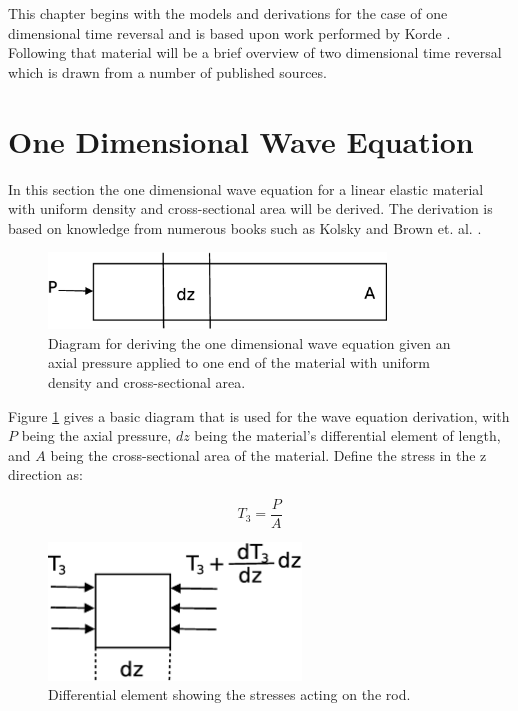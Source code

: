 This chapter begins with the models and derivations for the case of one dimensional time reversal and is based upon work performed by Korde \cite{Fehrman2012}. Following that material will be a brief overview of two dimensional time reversal which is drawn from a number of published sources.

\section{One Dimensional Wave Equation}
\label{sec:oneDWaveEquation}

In this section the one dimensional wave equation for a linear elastic material with uniform density and cross-sectional area will be derived. The derivation is based on knowledge from numerous books such as Kolsky \cite{Kolsky1963} and Brown et. al. \cite{Brown2008}.

\begin{figure}[ht!]
\centering
\includegraphics[width=0.8\textwidth]{eps_pics/deriveWaveRod}
\caption{Diagram for deriving the one dimensional wave equation given an axial pressure applied to one end of the material with uniform density and cross-sectional area.
	 \label{fig:deriveWaveRod}} 
\end{figure}

Figure \ref{fig:deriveWaveRod} gives a basic diagram that is used for the wave equation derivation, with $P$ being the axial pressure, $dz$ being the material's differential element of length, and $A$ being the cross-sectional area of the material. Define the stress in the z direction as:

\begin{equation}
T_3 = \frac{P}{A}
\end{equation}


\begin{figure}[ht!]
\centering
\includegraphics[width=0.6\textwidth]{eps_pics/diffElementRod}
\caption{Differential element showing the stresses acting on the rod.
	 \label{fig:diffElementRod}} 
\end{figure}


